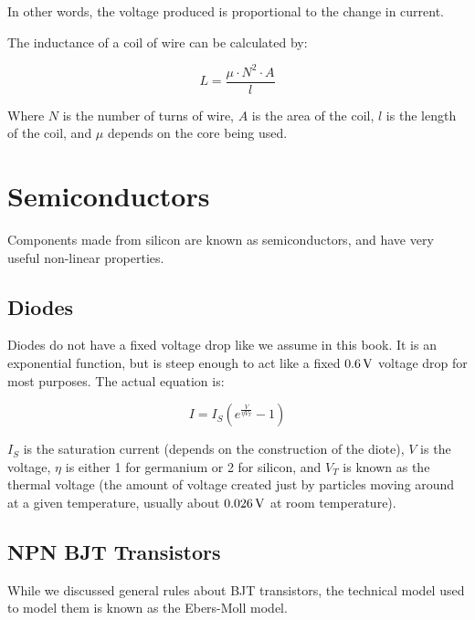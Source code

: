 In other words, the voltage produced is proportional to the change in current.

The inductance of a coil of wire can be calculated by:

\begin{equation}
L = \frac{\mu \cdot N^2 \cdot A}{l}
\end{equation}

Where $N$ is the number of turns of wire, $A$ is the area of the coil, $l$ is the length of the coil, and $\mu$ depends on the core being used.

\section{Semiconductors}

Components made from silicon are known as semiconductors, and have very useful non-linear properties.

\subsection{Diodes}

Diodes do not have a fixed voltage drop like we assume in this book.  
It is an exponential function, but is steep enough to act like a fixed $0.6\,\si{\volt}$ voltage drop for most purposes.
The actual equation is:

\begin{equation}
I = I_S (e^{\frac{V}{\eta V_T}} - 1)
\end{equation}

$I_S$ is the saturation current (depends on the construction of the diote), $V$ is the voltage, $\eta$ is either 1 for germanium or 2 for silicon, and $V_T$ is known as the thermal voltage (the amount of voltage created just by particles moving around at a given temperature, usually about $0.026\,\si{\volt}$ at room temperature).

\subsection{NPN BJT Transistors}

While we discussed general rules about BJT transistors, the technical model used to model them is known as the Ebers-Moll model.


